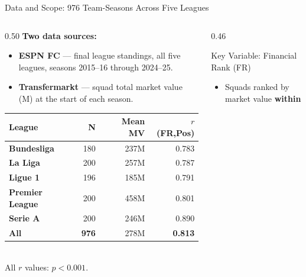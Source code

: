 \documentclass[aspectratio=1610,10pt]{beamer}
\begin{document}
\begin{frame}[shrink=8]{Data and Scope: 976 Team-Seasons Across Five Leagues}
  \begin{columns}[T]
    \begin{column}{0.50\textwidth}
      \vspace{2pt}
      \textbf{Two data sources:}
      \begin{itemize}\setlength\itemsep{4pt}
        \item \textbf{ESPN FC} --- final league standings, all five leagues,
              seasons 2015--16 through 2024--25.
        \item \textbf{Transfermarkt} --- squad total market value
              (\texteuro{}M) at the start of each season.
      \end{itemize}
      \vspace{6pt}
      {\small
      \begin{tabular}{@{}>{\bfseries}l r r r@{}}
        \toprule
        \rowcolor{NavyBlue!18}
        \color{white}League &
        \color{white}N &
        \color{white}Mean MV &
        \color{white}$r$(FR,Pos) \\
        \midrule
        Bundesliga     & 180 & \texteuro{}237M & 0.783 \\
        \rowcolor{RowA}
        La Liga        & 200 & \texteuro{}257M & 0.787 \\
        Ligue 1        & 196 & \texteuro{}185M & 0.791 \\
        \rowcolor{RowA}
        Premier League & 200 & \texteuro{}458M & 0.801 \\
        Serie A        & 200 & \texteuro{}246M & 0.890 \\
        \midrule
        \rowcolor{RowB}
        \textbf{All}   & \textbf{976} & \texteuro{}278M & \textbf{0.813} \\
        \bottomrule
      \end{tabular}%
      }%
      \\[3pt]
      {\footnotesize\color{SlateGrey} All $r$ values: $p < 0.001$.}
    \end{column}
    \begin{column}{0.46\textwidth}
      \begin{block}{Key Variable: Financial Rank (FR)}
        {\small\begin{itemize}\setlength\itemsep{5pt}
          \item Squads ranked by market value \textbf{within
}
\end{itemize}}
\end{block}
\end{column}
\end{columns}
\end{frame}
\end{document}

